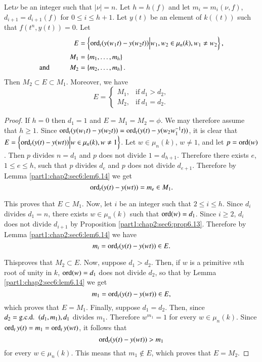 \begin{prop}\label{part1:chap2:sec6:prop6.15}
  Let\pageoriginale $\nu$ be an integer such that $|\nu|=n$. Let $h= h(f)$ and let $m_i= m_i (\nu, f)$, $d_{i+1}= d_{i+1} (f)$ for $0 \leq i \leq h+1$. Let $y(t)$ be an element of $k((t))$ such that $f(t^n, y(t))=0$. Let
\begin{align*}
   E & = \left\{ \ord_t (y(w_1t) -  y(w_2t)) \Big| w_1, w_2 \in \mu_n (k), w_1 \neq w_2\right\},\\
   M_1 & = \left\{ m_1 , \ldots , m_h\right\}\\
\text{and} \hspace{1cm} M_2 & = \left\{ m_2 , \ldots , m_h \right\}.
\end{align*}
Then $M_2 \subset E \subset M_1$. Moreover, we have
$$E= 
\begin{cases}
  M_1, & \text{if}~ d_1 > d_2,\\
  M_2, & \text{if}~ d_1 = d_2.
\end{cases}
$$
\end{prop}

\begin{proof}
  If $h=0$ then $d_1 =1$ and $E = M_1 = M_2 = \phi$. We may therefore assume that $h \geq 1$. Since $\ord_t (y(w_1t)- y (w_2t))= \ord_t (y(t)- y(w_2 w_1^{-1}t))$, it is clear that $   E = \left\{ \ord_t (y(t) - y(wt)) \Big| w \in \mu_n (k), w \neq 1\right\}$. Let $w \in \mu_n(k)$, $w \neq 1$, and let $p = \ord (w)$. Then $p$ divides $n= d_1$ and $p$ does not divide $1= d_{h+1}$. Therefore there exists $e$, $1 \leq e \leq h$, such that $p$ divides $d_e$ and $p$ does not divide $d_{e+1}$. Therefore by Lemma \ref{part1:chap2:sec6:lem6.14} we get
$$
\ord_t (y(t)- y (wt))= m_e \in M_1.
$$

This proves that $E \subset M_1$. Now, let $i$ be an integer such that $2 \leq i \leq h$. Since $d_i$ divides $d_1=n$, there exists $w \in \mu_n (k)$ such that $\ord(w)=d_1$. Since $i \geq 2$, $d_i$ does not divide $d_{i+1}$ by Proposition \ref{part1:chap2:sec6:prop6.13}. Therefore by Lemma \ref{part1:chap2:sec6:lem6.14} we have
$$
m_i = \ord_t (y(t)- y(wt))\in E.
$$

This\pageoriginale proves that $M_2 \subset E$. Now, suppose $d_1 > d_2$. Then, if $w$ is a primitive $n$th root of unity in $k$, $\ord(w)= d_1$ does not divide $d_2$, so that by Lemma \ref{part1:chap2:sec6:lem6.14} we get
$$
m_1 = \ord_t (y(t)- y(wt))\in E,
$$
which proves that $E= M_1$. Finally, suppose $d_1= d_2$. Then, since $d_2= \text{\gcd}~(d_1, m_1), d_1$ divides $m_1$. Therefore $w^{m_1}=1$ for every $w\in \mu_n (k)$. Since $\ord
_t y(t)= m_1 = \ord_t y(wt)$, it follows that
$$
\ord_t (y(t)- y(wt)) > m_1
$$
for every $w \in \mu_n (k)$. This means that $m_1 \notin E$, which proves that $E= M_2$.
\end{proof}

